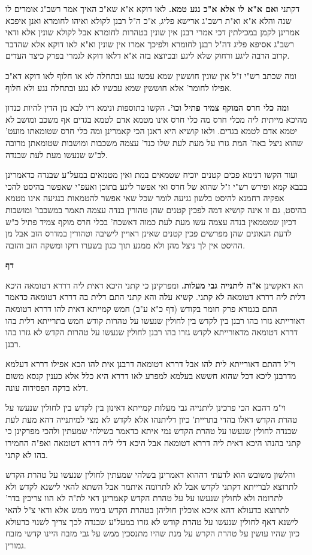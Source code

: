 \documentclass[12pt, openany]{book}
\newcommand{\sethebfont}{
\fontsize{10.5pt}{21.0pt} \selectfont
}
\newcommand{\twocol}[1]{
	{\sethebfont \begin{multicols}{2}
			#1
	\end{multicols}}	
}
\newcommand{\chapname}{}
\newcommand{\newchap}[1]{
	\addcontentsline{toc}{chapter}{#1}
	\renewcommand{\chapname}{#1}
		\begin{center}
			\textbf{%
\fontsize{16pt}{16pt}\selectfont
				#1}
		\end{center}
}
\begin{document}
{ דקתני \textbf{ואם א"א לו אלא א"כ נגע טמא.}  לאו דוקא א"א שא"כ האיך אמר רשב"ג אומרים לו שנה והלא א"א וא"ת רשב"ג ארישא פליג, א"כ ה"ל רבנן לקולא ואיהו לחומרא ואנן איפכא אמרינן לקמן במכילתין דכי אמרי רבנן אין שונין בטהרות לחומרא אבל לקולא שונין אלא ודאי רשב"ג אסיפא פליג דה"ל רבנן לחומרא ולפיכך אמרו אין שונין וא"א לאו דוקא אלא שהדבר קרוב הרבה ליגע ורחוק שלא ליגע ובכיוצא בזה א"א דלאו דוקא לגמרי בפרק כיצד העדים.\par  ומה שכתב רש"י ז"ל אין שונין חוששין שמא עכשו נגע ובתחלה לא או חלוף לאו דוקא דא"כ אפילו לחומר' אלא חוששין שמא עכשיו לא נגע ובתחלה נגע ולא חלוף. 
\par\textbf{ומה כלי חרס המוקף צמיד פתיל וכו'.}  הקשו בתוספות ונימא דיו לבא מן הדין להיות כנדון מהיכא מייתית ליה מכלי חרס מה כלי חרס אינו מטמא אדם לטמא בגדים אף משכב ומושב לא יטמא אדם לטמא בגדים. ולאו קושיא היא דאנן הכי קאמרינן ומה כלי חרס שטומאתו מועט' שהוא ניצל באה' המת גזרו על מעת לעת שלו כנד' עצמה משכבות ומושבות שטומאתן מרובה לכ"ש שנעשו מעת לעת שבנדה.\par  ועוד הקשו דנימא פכים קטנים יוכיח שטמאים במת ואין מטמאים במעל"ע שבנדה כדאמרינן בבבא קמא ופירש רש"י ז"ל שהוא של חרס ואי אפשר ליגע בתוכן ואעפ"י שאפשר בהיסט להכי אפקיה רחמנא להיסט בלשון נגיעה לומר שכל שאי אפשר להטמאות בנגיעה אינו מטמא בהיסט, גם זו אינה קושיא דמה לפכין קטנים שהן טהורין בנדה עצמה תאמר במשכבו' ומושבות דכיון שמטמאין בנדה עצמה עשו מעת לעת כמוה דאשכח' בכלי חרס מוקף צמיד פתיל כ"ש לדעת הגאונים שהן מפרשים פכין קטנים שאינן ראויין לישיבה וטהורין במדרס הזב אבל מן ההיסט אין לך ניצל מהן ולא ממגע תוך כגון בשערו רוקו ומשקה הזב והזבה. 
\par}
\newchap{דף }
\twocol{הא דאקשינן \textbf{א"ה ליתנייה גבי מעלות.}  ומפרקינן כי קתני היכא דאית ליה דררא דטומאה היכא דלית ליה דררא דטומאה לא קתני. קשיא עלה והא קתני התם דלית בה דררא דטומאה כדאמר התם בגמרא פרק חומר בקודש (דף כ"א ע"ב) חמש קמייתא דאית להו דררא דטומאה דאורייתא גזרו בהו רבנן בין לקדש בין לחולין שנעשו על טהרות קודש חמש בתרייתא דלית בהו דררא דטומאה מדאורייתא לקדש גזרו בהו רבנן לחולין שנעשו על טהרות הקדש לא גזרו בהו רבנן.\par  וי"ל דהתם דאורייתא לית להו אבל דררא דטומאה דרבנן אית להו הכא אפילו דררא דעלמא מדרבנן ליכא דכל שהוא חששא בעלמא למפרע לאו דררא היא כלל אלא כענין קנסא משום דלא בדקה הפסידוה עונה.\par  וי"מ דהכא הכי פרכינן ליתנייה גבי מעלות קמייתא דאינון בין לקדש בין לחולין שנעשו על טהרת הקדש דאלו בהדי בתריית' כיון דליתנהו אלא לקדש לא מצי למיתנייה דהא מעת לעת שבנדה לחולין שנעשו על טהרת הקדש נמי איתא כדאמר בשילהי שמעתין ולהכי מפרקינן כי קתני בהנהו היכא דאית ליה דררא דטומאה אבל היכא דלי ליה דררא דטומאה ואפ"ה החמירו בהו לא קתני.\par והלשון משובש הוא לדעתי דההוא דאמרינן בשלהי שמעתין לחולין שנעשו על טהרת הקדש לתרוצא לברייתא דקתני לקדש אבל לא לתרומה איתמר אבל השתא להאי לישנא לקדש ולא לתרומה ולא לחולין שנעשו על על טהרת הקדש קאמרינן דאי לת"ה לא הוו צריכין בדר' לתרוצא כדעולא דהא איכא אוכלין חוליהן בטהרת הקדש בימיו ממש אלא ודאי צ"ל להאי לישנא דאף לחולין שנעשו על טהרת קודש לא גזרו במעל"ע שבנדה לכך צריך לשנוי כדעולא כיון שהיו עושין על טהרת הקרש על מנת שהיו מתנסכין ממש על גבי מזבח היינו קדשי מזבח גמורין. 
\par}
\end{document}
